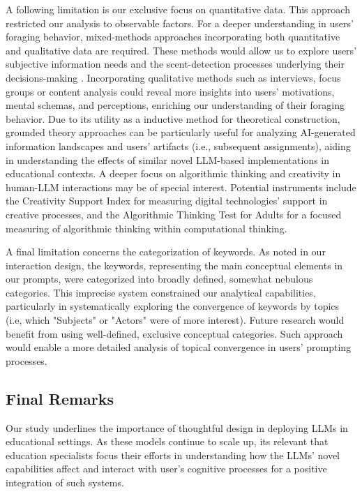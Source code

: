 \documentclass[sn-mathphys, Numbered]{sn-jnl}%
\theoremstyle{thmstyleone}%
\theoremstyle{thmstyletwo}%
\theoremstyle{thmstylethree}%
\begin{document}
A following limitation is our exclusive focus on quantitative data. This approach restricted our analysis to observable factors. For a deeper understanding in users' foraging behavior, mixed-methods approaches incorporating both quantitative and qualitative data are required. These methods would allow us to explore users' subjective information needs and the scent-detection processes underlying their decisions-making \parencite{pirolli_information_1999}. Incorporating qualitative methods such as interviews, focus groups or content analysis could reveal more insights into users' motivations, mental schemas, and perceptions, enriching our understanding of their foraging behavior. Due to its utility as a inductive method for theoretical construction, grounded theory approaches \parencite{strauss_grounded_1997} can be particularly useful for analyzing AI-generated information landscapes and users' artifacts (i.e., subsequent assignments), aiding in understanding the effects of similar novel LLM-based implementations in educational contexts. A deeper focus on algorithmic thinking and creativity in human-LLM interactions may be of special interest. Potential instruments include the Creativity Support Index \parencite{cherry_quantifying_2014} for measuring digital technologies' support in creative processes, and the Algorithmic Thinking Test for Adults \parencite{lafuente_martinez_assessing_2022} for a focused measuring of algorithmic thinking within computational thinking. 

A final limitation concerns the categorization of keywords. As noted in our interaction design, the keywords, representing the main conceptual elements in our prompts, were categorized into broadly defined, somewhat nebulous categories. This imprecise system constrained our analytical capabilities, particularly in systematically exploring the convergence of keywords by topics (i.e, which "Subjects" or "Actors" were of more interest). Future research would benefit from using well-defined, exclusive conceptual categories. Such approach would enable a more detailed analysis of topical convergence in users' prompting processes. 

\subsection*{Final Remarks}\label{Conclusion}

Our study underlines the importance of thoughtful design in deploying LLMs in educational settings. As these models continue to scale up, its relevant that education specialists focus their efforts in understanding how the LLMs' novel capabilities affect and interact with user's cognitive processes for a positive integration of such systems.
\end{document}
